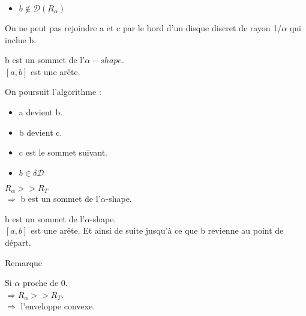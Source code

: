 \documentclass{beamer}
\begin{document}
\begin{frame}
\begin{columns}[t]
\begin{column}{3cm}
\begin{block}{}
{        }
        {
          \begin{itemize}
            \item $b \notin \mathcal{D} \left( R_{\alpha} \right)$
          \end{itemize}
          On ne peut pas rejoindre a et c par le bord d'un disque discret de rayon 1/$\alpha$ qui inclue b.
        }
        {
          b est un sommet de l'$\alpha-shape$.\\
          $[a, b]$ est une arête.
        }
        {
          On poursuit l'algorithme :\\
          \begin{itemize}
            \item a devient b.
            \item b devient c.
            \item c est le sommet suivant.
          \end{itemize}
        }
        {
          \begin{itemize}
            \item $b \in \delta \mathcal{D}$
          \end{itemize}
          $R_{\alpha} >> R_T$\\
          $\Rightarrow$ b est un sommet de l'$\alpha$-shape.\\
          
        }
        {
          b est un sommet de l'$\alpha$-shape.\\
          $[a, b]$ est une arête.
        }
        {
          Et ainsi de suite jusqu'à ce que b revienne au point de départ.\\
        }
      \end{block}
      {
        \begin{block}{Remarque}
        
          \alert{Si $\alpha$ proche de 0.}\\
          \alert{$\Rightarrow R_{\alpha} >> R_T$.}\\
          \alert{$\Rightarrow$ l'enveloppe convexe.}\\

        \end{block}
      }  
    \end{column}
  \end{columns}

\end{frame}
\end{document}
